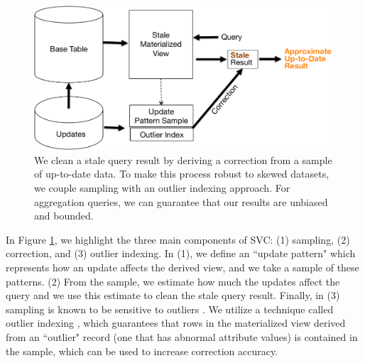 \begin{figure}[ht]
\centering
 \includegraphics[scale=0.30]{figs/sys-arch.pdf}
 \caption{We clean a stale query result by deriving a correction from a sample of up-to-date data. To make this process robust to skewed datasets, we couple sampling with an outlier indexing approach. For aggregation queries, we can guarantee that our results are unbiased and bounded. \label{sys-arch}}
\end{figure}

In Figure \ref{sys-arch}, we highlight the three main components of SVC: (1) sampling, (2) correction, and (3) outlier indexing. In (1), we define an ``update pattern" which represents how an update affects the derived view, and we take a sample of these patterns. (2)  From the sample, we estimate how much the updates affect the query and we use this estimate to clean the stale query result.
Finally, in (3) sampling is known to be sensitive to outliers \cite{chaudhuri2001overcoming}.
We utilize a technique called outlier indexing \cite{chaudhuri2001overcoming}, which guarantees that rows in the materialized view derived from an ``outlier" record (one that has abnormal attribute values) is contained in the sample, which can be used to increase correction accuracy.

